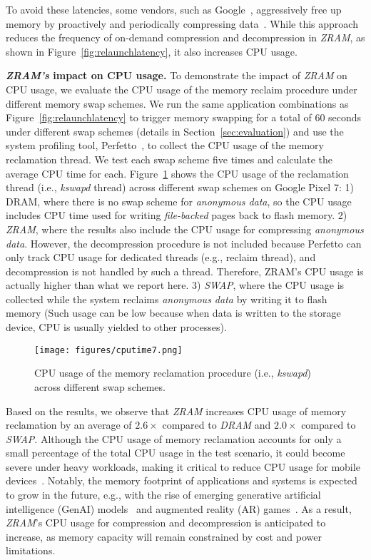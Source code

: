 To avoid these latencies, some vendors, such as Google~\cite{Galaxys}, aggressively free up memory by proactively and periodically compressing data~\cite{Pixel7}. While this approach reduces the frequency of on-demand compression and decompression in \emph{ZRAM}, as shown in Figure~\ref{fig:relaunchlatency}, it also increases CPU usage.

\noindent\textbf{\emph{ZRAM's} impact on CPU usage.}
To demonstrate the impact of  \emph{ZRAM} on CPU usage, we evaluate the CPU usage of the memory reclaim procedure under different memory swap schemes. 
We run the same application combinations as Figure~\ref{fig:relaunchlatency} to trigger memory swapping for a total of 60 seconds under different swap schemes (details in Section~\ref{sec:evaluation}) and use the system profiling tool, Perfetto~\cite{Perfetto}, to collect the CPU usage of the memory reclamation thread.
We test each swap scheme five times and calculate the average CPU time for each.
Figure~\ref{fig:cputime} shows the CPU usage of the reclamation thread (i.e., \emph{kswapd} thread) across different swap schemes on Google Pixel 7: 1) DRAM, where there is no swap scheme for \emph{anonymous data}, so the CPU usage includes CPU time used for writing \emph{file-backed} pages back to flash memory. 2)  \emph{ZRAM}, where the results also include the CPU usage for compressing \emph{anonymous data}.  However, the decompression procedure is not included because Perfetto can only track CPU usage for dedicated threads (e.g., reclaim thread), and decompression is not handled by such a thread. Therefore, ZRAM’s CPU usage is actually higher than what we report here. 3) \emph{SWAP}, where the CPU usage is collected while the system reclaims \emph{anonymous data} by writing it to flash
memory (Such usage can be low because when data is written to the storage device, CPU is usually yielded to other processes).


\begin{figure}[!h]
\centering
\texttt{[image: figures/cputime7.png]}
\caption{CPU usage of the memory reclamation procedure (i.e., \emph{kswapd}) across different swap schemes.}
\label{fig:cputime}
\end{figure}

Based on the results, we observe that  \emph{ZRAM} increases CPU usage of memory reclamation by an average of $2.6\times$ compared to \emph{DRAM} and $2.0\times$ compared to \emph{SWAP}. 
Although the CPU usage of memory reclamation accounts for only a small percentage of the total CPU usage in the test scenario, it could become severe under heavy workloads, making it critical to reduce CPU usage for mobile devices~\cite{zhong2015energy, hort2021survey, chang2019lsim, nguyen2013storage}. Notably, the memory footprint of applications and systems is expected to grow in the future, e.g., with the rise of emerging generative artificial intelligence (GenAI) models~\cite{yin2024llm, karapantelakis2024generative, wen2023empowering} and augmented reality (AR) games~\cite{AR1, AR2, AR3, AR5}. As a result, \emph{ZRAM}'s CPU usage for compression and decompression is anticipated to increase, as memory capacity will remain constrained by cost and power limitations.

